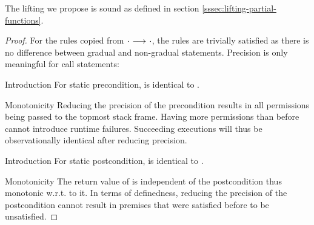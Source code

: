 \begin{lemma}
    The lifting we propose is sound as defined in section \ref{sssec:lifting-partial-functions}.
\end{lemma}
\begin{proof}
    For the rules copied from ${\cdot} \,\,{\longrightarrow^{}}\,\, {\cdot}$, the rules are trivially satisfied as there is no difference between gradual and non-gradual statements.
    Precision is only meaningful for call statements:

    
        Introduction
        For static precondition,  is identical to .
        
        Monotonicity
        Reducing the precision of the precondition results in all permissions being passed to the topmost stack frame.
        Having more permissions than before cannot introduce runtime failures.
        Succeeding executions will thus be observationally identical after reducing precision.
        
        Introduction
        For static postcondition,  is identical to .
        
        Monotonicity
        The return value of  is independent of the postcondition thus monotonic w.r.t. to it.
        In terms of definedness, reducing the precision of the postcondition cannot result in premises that were satisfied before to be unsatisfied.
\end{proof}